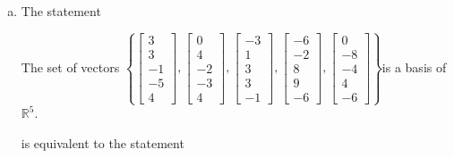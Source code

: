 \begin{exerciseAnswer}
\begin{enumerate}[(a)]
\item The statement 
\begin{center}\begin{minipage}{0.8\textwidth}
 The set of vectors \( \left\{ \left[\begin{array}{c}
3 \\
3 \\
-1 \\
-5 \\
4
\end{array}\right] , \left[\begin{array}{c}
0 \\
4 \\
-2 \\
-3 \\
4
\end{array}\right] , \left[\begin{array}{c}
-3 \\
1 \\
3 \\
3 \\
-1
\end{array}\right] , \left[\begin{array}{c}
-6 \\
-2 \\
8 \\
9 \\
-6
\end{array}\right] , \left[\begin{array}{c}
0 \\
-8 \\
-4 \\
4 \\
-6
\end{array}\right] \right\} \)is a basis of \(\mathbb{R}^5\). 
\end{minipage}\end{center}
     is equivalent to the statement 
\begin{center}\begin{minipage}{0.8\textwidth}
 The set of vectors \( \left\{ \left[\begin{array}{c}
3 \\
3 \\
-1 \\
-5 \\
4
\end{array}\right] , \left[\begin{array}{c}
0 \\
4 \\

\end{array}
\end{minipage}
\end{center}
\end{enumerate}
\end{exerciseAnswer}
